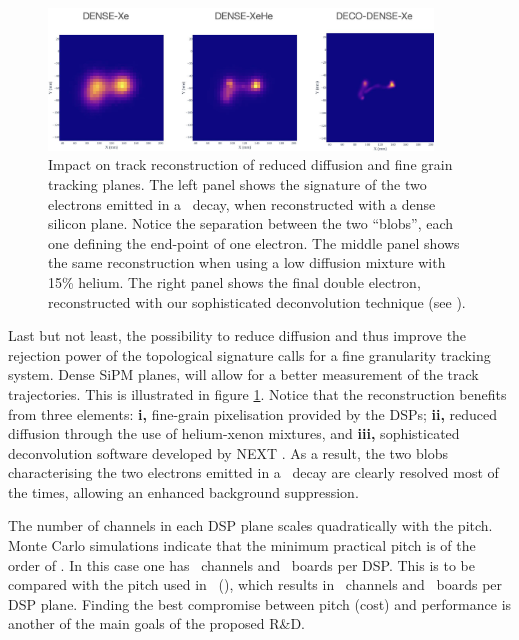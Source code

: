\begin{figure}[htbp!]
  \begin{center}
      \includegraphics[width=0.91\textwidth]{img2/tracks.jpg}
    \caption{Impact on track reconstruction of reduced diffusion and fine grain tracking planes. The left panel shows the signature of the two electrons emitted in a \bb\ decay, when reconstructed with a dense silicon plane. Notice the separation between the two ``blobs'', each one defining the end-point of one electron. The middle panel shows the same reconstruction when using a low diffusion mixture with 15\% helium. The right panel shows the final double electron, reconstructed with our sophisticated deconvolution technique (see \cite{NEXT:2020jmz}).} 
    \label{fig.DSP}
  \end{center}
\end{figure}

\indent

Last but not least, the possibility to reduce diffusion and thus improve the rejection power of the topological signature calls for a fine granularity tracking system. Dense SiPM planes, will allow for a better measurement of the track trajectories. This  is illustrated in figure  \ref{fig.DSP}. 
Notice that the reconstruction benefits from three elements: {\bf i,} fine-grain pixelisation provided by the DSPs;  {\bf ii,} reduced diffusion through the use of  helium-xenon mixtures, and {\bf iii,} sophisticated deconvolution software developed by NEXT \cite{NEXT:2020jmz}.  As a result, the two blobs characterising the two electrons emitted in a \bb\ decay are clearly resolved most of the times, allowing an enhanced background suppression. 

\indent

The number of channels in each DSP plane scales quadratically with the pitch. Monte Carlo simulations indicate that the minimum practical pitch is of the order of 
\DSPMNP. In this case one has \DSPMNPC\ channels and \DSPMNPB\ boards per DSP. This is to be compared with the pitch used in \NEW\ (\DSPMXP), 
which results in \DSPMXPC\ channels and \DSPMXPB\ boards per DSP plane. Finding the best compromise between pitch (cost) and performance is another of the main goals of the proposed R\&D.

